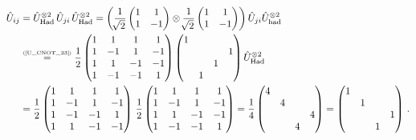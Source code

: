 \documentclass[11pt]{article}
\numberwithin{equation}{section} %
\numberwithin{figure}{section} %
\newcommand\numeq[1] %
  {\stackrel{\scriptscriptstyle(\mkern-1.5mu#1\mkern-1.5mu)}{=}}
\begin{document}
\begin{equation}
\begin{split}
\hat{U}_{ij}
&	=\hat{U}_{\textrm{Had}}^{\otimes 2}\,\hat{U}_{ji}\,\hat{U}_{\textrm{Had}}^{\otimes 2}=\left( \frac{1}{\sqrt[]{2}}\begin{pmatrix}1&1\\ 1&-1\end{pmatrix}\otimes \frac{1}{\sqrt[]{2}}\begin{pmatrix}1&1\\ 1&-1\end{pmatrix} \right)\hat{U}_{ji}\hat{U}_{\textrm{had}}^{\otimes 2}\\
&	\numeq{\textrm{\ref{U_CNOT_23}}}\frac{1}{2}\begin{pmatrix}1&1&1&1\\ 1&-1&1&-1\\ 1&1&-1&-1\\ 1&-1&-1&1\end{pmatrix} \begin{pmatrix}1&&&\\ &&&1\\ &&1&\\ &1&&\end{pmatrix} \hat{U}_{\textrm{Had}}^{\otimes 2}\\
&	= \frac{1}{2}\begin{pmatrix}1&1&1&1\\ 1&-1&1&-1\\ 1&-1&-1&1\\ 1&1&-1&-1\end{pmatrix}\,\frac{1}{2}\begin{pmatrix}1&1&1&1\\ 1&-1&1&-1\\ 1&1&-1&-1\\ 1&-1&-1&1\end{pmatrix}=\frac{1}{4}\begin{pmatrix}4&&&\\ &4&&\\ &&&4\\ &&4&\end{pmatrix}= \begin{pmatrix}1&&&\\ &1&&\\ &&&1\\ &&1&\end{pmatrix}\,\textrm{.}
\end{split}
\end{equation}
\end{document}
